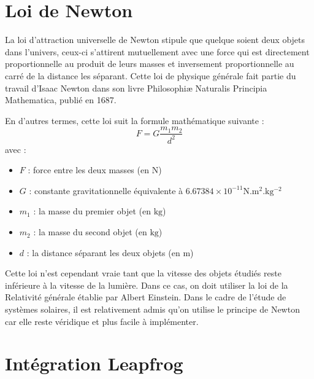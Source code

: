 \documentclass{article}
\begin{document}
\section*{Loi de Newton}

La loi d'attraction universelle de Newton stipule que quelque soient deux objets dans l'univers, ceux-ci s'attirent mutuellement avec une force qui est directement proportionnelle au produit de leurs masses et inversement proportionnelle au carré de la distance les séparant.
Cette loi de physique générale fait partie du travail d'Isaac Newton dans son livre Philosophiæ Naturalis Principia Mathematica, publié en 1687.

En d'autres termes, cette loi suit la formule mathématique suivante :
\[
F = G\frac{m_1m_2}{d^2}
\]
avec :
\begin{itemize}
\item $F$ : force entre les deux masses (en $\mathrm{N}$)
\item $G$ : constante gravitationnelle équivalente à $6.67384 \times 10^{-11} \mathrm{N.m^2.kg^{-2}}$
\item $m_1$ : la masse du premier objet (en $\mathrm{kg}$)
\item $m_2$ : la masse du second objet (en $\mathrm{kg}$)
\item $d$ : la distance séparant les deux objets (en $\mathrm{m}$)
\end{itemize}

Cette loi n'est cependant vraie tant que la vitesse des objets étudiés reste inférieure à la vitesse de la lumière. Dans ce cas, on doit utiliser la loi de la Relativité générale établie par Albert Einstein.
Dans le cadre de l'étude de systèmes solaires, il est relativement admis qu'on utilise le principe de Newton car elle reste véridique et plus facile à implémenter.

\section*{Intégration Leapfrog}
\end{document}
